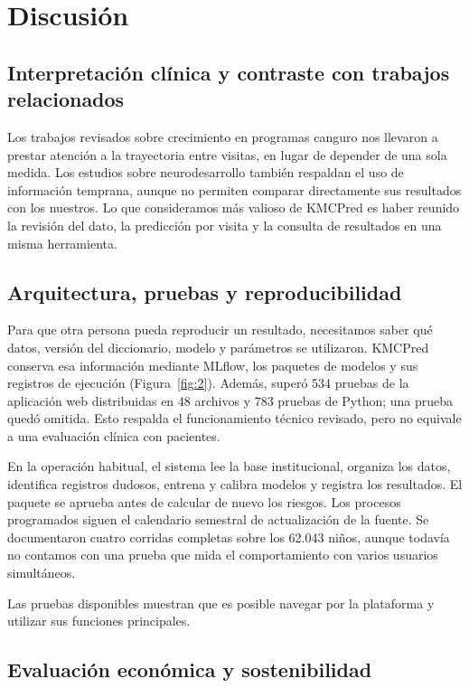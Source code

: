 \section{Discusión}
\label{sec:discusion}

\subsection{Interpretación clínica y contraste con trabajos relacionados}
\label{sec:5.1}

Los trabajos revisados sobre crecimiento en programas canguro \cite{r5,r7} nos llevaron a prestar atención a la trayectoria entre visitas, en lugar de depender de una sola medida. Los estudios sobre neurodesarrollo \cite{r8,r9,r10} también respaldan el uso de información temprana, aunque no permiten comparar directamente sus resultados con los nuestros. Lo que consideramos más valioso de KMCPred es haber reunido la revisión del dato, la predicción por visita y la consulta de resultados en una misma herramienta.

\subsection{Arquitectura, pruebas y reproducibilidad}
\label{sec:5.2}

Para que otra persona pueda reproducir un resultado, necesitamos saber qué datos, versión del diccionario, modelo y parámetros se utilizaron. KMCPred conserva esa información mediante MLflow, los paquetes de modelos y sus registros de ejecución (Figura~\ref{fig:2}). Además, superó 534 pruebas de la aplicación web distribuidas en 48 archivos y 783 pruebas de Python; una prueba quedó omitida. Esto respalda el funcionamiento técnico revisado, pero no equivale a una evaluación clínica con pacientes.

En la operación habitual, el sistema lee la base institucional, organiza los datos, identifica registros dudosos, entrena y calibra modelos y registra los resultados. El paquete se aprueba antes de calcular de nuevo los riesgos. Los procesos programados siguen el calendario semestral de actualización de la fuente. Se documentaron cuatro corridas completas sobre los 62.043 niños, aunque todavía no contamos con una prueba que mida el comportamiento con varios usuarios simultáneos.

Las pruebas disponibles muestran que es posible navegar por la plataforma y utilizar sus funciones principales.

\subsection{Evaluación económica y sostenibilidad}
\label{sec:5.3}

